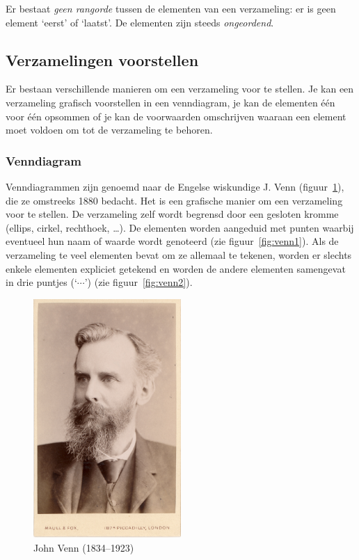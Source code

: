 Er bestaat \emph{geen rangorde} tussen de elementen van een verzameling: er is geen element `eerst' of `laatst'. De elementen zijn steeds \emph{ongeordend}. 

\subsection{Verzamelingen voorstellen}
Er bestaan verschillende manieren om een verzameling voor te stellen. Je kan een verzameling grafisch voorstellen in een venndiagram, je kan de elementen \'e\'en voor \'e\'en opsommen of je kan de voorwaarden omschrijven waaraan een element moet voldoen om tot de verzameling te behoren.

\subsubsection{Venndiagram}
Venndiagrammen zijn genoemd naar de Engelse wiskundige J. Venn (figuur~\ref{fig:venn}), die ze omstreeks 1880 bedacht. Het is een grafische manier om een verzameling voor te stellen. De verzameling zelf wordt begrensd door een gesloten kromme (ellips, cirkel, rechthoek, \dots). De elementen worden aangeduid met punten waarbij eventueel hun naam of waarde wordt genoteerd (zie figuur~\ref{fig:venn1}). Als de verzameling te veel elementen bevat om ze allemaal te tekenen, worden er slechts enkele elementen expliciet getekend en worden de andere elementen samengevat in drie puntjes (`$\cdots$') (zie figuur~\ref{fig:venn2}).

\begin{figure}[htbp]
\centering
\includegraphics[width=0.5\textwidth]{figuren/verzamelingen_relaties/venn.jpg}
\caption{John Venn (1834--1923)}
\label{fig:venn}
\end{figure}

